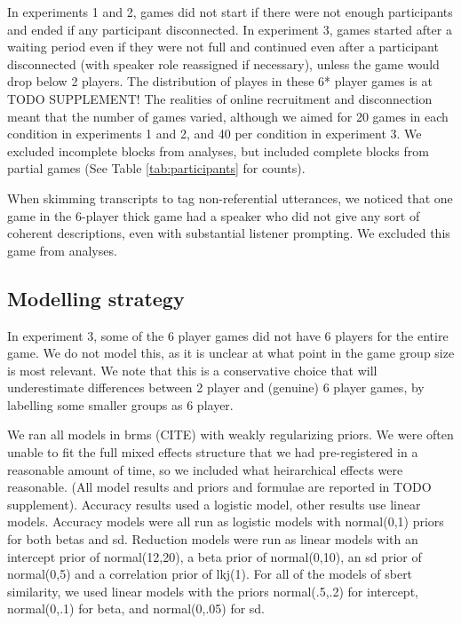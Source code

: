\documentclass[
  english,
  a4paper,
]{article}
\begin{document}
In experiments 1 and 2, games did not start if there were not enough participants and ended if any participant disconnected. In experiment 3, games started after a waiting period even if they were not full and continued even after a participant disconnected (with speaker role reassigned if necessary), unless the game would drop below 2 players. The distribution of playes in these 6* player games is at TODO SUPPLEMENT! The realities of online recruitment and disconnection meant that the number of games varied, although we aimed for 20 games in each condition in experiments 1 and 2, and 40 per condition in experiment 3. We excluded incomplete blocks from analyses, but included complete blocks from partial games (See Table \ref{tab:participants} for counts).

When skimming transcripts to tag non-referential utterances, we noticed that one game in the 6-player thick game had a speaker who did not give any sort of coherent descriptions, even with substantial listener prompting. We excluded this game from analyses.

\hypertarget{modelling-strategy}{%
\subsection{Modelling strategy}\label{modelling-strategy}}

In experiment 3, some of the 6 player games did not have 6 players for the entire game. We do not model this, as it is unclear at what point in the game group size is most relevant. We note that this is a conservative choice that will underestimate differences between 2 player and (genuine) 6 player games, by labelling some smaller groups as 6 player.

We ran all models in brms (CITE) with weakly regularizing priors. We were often unable to fit the full mixed effects structure that we had pre-registered in a reasonable amount of time, so we included what heirarchical effects were reasonable. (All model results and priors and formulae are reported in TODO supplement). Accuracy results used a logistic model, other results use linear models. Accuracy models were all run as logistic models with normal(0,1) priors for both betas and sd. Reduction models were run as linear models with an intercept prior of normal(12,20), a beta prior of normal(0,10), an sd prior of normal(0,5) and a correlation prior of lkj(1). For all of the models of sbert similarity, we used linear models with the priors normal(.5,.2) for intercept, normal(0,.1) for beta, and normal(0,.05) for sd.
\end{document}

